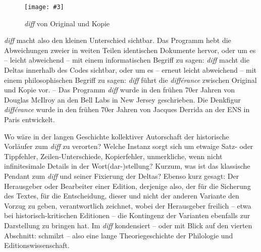 \documentclass[a4paper,11pt]{article}
\newcommand{\pngbild}[4]{\texttt{[image: \#3]}}
\begin{document}

\begin{figure}[ht]
\begin{center}
\pngbild{433}{176}{../bilder/Abb-2.png}{1.1\textwidth}\\[-3mm]
\caption{\emph{diff} von Original und Kopie}\label{abb:orikopie}
\end{center}
\end{figure}

\emph{diff} macht also den kleinen Unterschied sichtbar. Das Programm hebt die Abweichungen zweier in weiten Teilen identischen Dokumente hervor, oder um es – leicht abweichend – mit einem informatischen Begriff zu sagen: \emph{diff} macht die Deltas innerhalb des Codes sichtbar, oder um es – erneut leicht abweichend – mit einem philosophischen Begriff zu sagen: \emph{diff} führt die \emph{différance} zwischen Original und Kopie vor. – Das Programm \emph{diff} wurde in den frühen 70er Jahren von Douglas McIlroy an den Bell Labs in New Jersey geschrieben. Die Denkfigur \emph{différance} wurde in den frühen 70er Jahren von Jacques Derrida an der ENS in Paris entwickelt. 

Wo wäre in der langen Geschichte kollektiver Autorschaft der historische Vorläufer zum \emph{diff} zu verorten? Welche Instanz sorgt sich um etwaige Satz- oder Tippfehler, Zeilen-Unterschiede, Kopierfehler, unmerkliche, wenn nicht infinitesimale Details in der Wort(dar-)stellung? Kurzum, was ist das klassische Pendant zum \emph{diff} und seiner Fixierung der Deltas? Ebenso kurz gesagt: Der Herausgeber oder Bearbeiter einer Edition, derjenige also, der für die Sicherung des Textes, für die Entscheidung, dieser und nicht der anderen Variante den Vorzug zu geben, verantwortlich zeichnet, wobei der Herausgeber freilich – etwa bei historisch-kritischen Editionen – die Kontingenz der Varianten ebenfalls zur Darstellung zu bringen hat. Im \emph{diff} kondensiert – oder mit Blick auf den vierten Abschnitt: schmilzt – also eine lange Theoriegeschichte der Philologie und Editionswissenschaft.  
\end{document}
